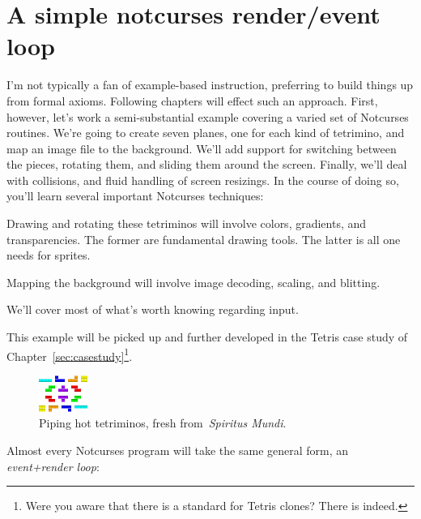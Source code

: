 \section{A simple notcurses render\slash event loop}
\label{sec:simpleloop}
I'm not typically a fan of example-based instruction, preferring to build things
up from formal axioms. Following chapters will effect such an approach. First,
however, let's work a semi-substantial example covering a varied set of
Notcurses routines. We're going to create seven planes, one for each kind
of tetrimino, and map an image file to the background. We'll add support for
switching between the pieces, rotating them, and sliding them around the
screen. Finally, we'll deal with collisions, and fluid handling of
screen resizings. In the course of doing so, you'll learn several important
Notcurses techniques:

\begin{denseitemize}
\item{Drawing and rotating these tetriminos will involve colors, gradients, and
      transparencies. The former are fundamental drawing tools. The latter is
      all one needs for sprites.}
\item{Mapping the background will involve image decoding, scaling, and blitting.}
\item{We'll cover most of what's worth knowing regarding input.}
\end{denseitemize}

This example will be picked up and further developed in the Tetris case study
of Chapter~\ref{sec:casestudy}\footnote{Were you aware that there is a
standard for Tetris clones? There is indeed\cite{tetris}.}.

\begin{figure}[!htbp]
\centering \includegraphics[width=.5\linewidth]{media/tetriminos.png}
\caption{Piping hot tetriminos, fresh from~\textit{Spiritus Mundi}.}
\label{fig:tetriminos}
\end{figure}

Almost every Notcurses program will take the same general form, an \textit{event+render loop}:

